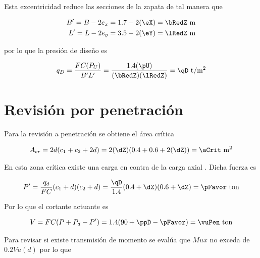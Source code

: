 \documentclass[11pt,a4paper,fleqn]{article}
\begin{document}
Esta excentricidad reduce las secciones de la zapata de tal manera que


\begin{align*}
	B'=B-2e_x=\bZ-2(\eX)=\bRedZ \text{ m}\\
	L'=L-2e_y=\lZ-2(\eY)=\lRedZ \text{ m}
\end{align*}

por lo que la presión de diseño es

\begin{align*}
	q_D=\frac{FC(P_U)}{B'L'}=\frac{\fcCarga(\pU)}{(\bRedZ)(\lRedZ)}=\qD \text{ t/m$^2$}
\end{align*}

\section{Revisión por penetración}
Para la revisión a penetración se obtiene el área crítica


\begin{align*}
	A_{cr}=2d(c_1+c_2+2d)=2(\dZ)(\caZ+\cbZ+2(\dZ))=\aCrit \text{ m$^2$}
\end{align*}

En esta zona crítica existe una carga en contra de la carga axial . Dicha fuerza es

\begin{align*}
	P'=\frac{q_d}{FC}(c_1+d)(c_2+d)=\frac{\qD}{\fcCarga}(\caZ+\dZ)(\cbZ+\dZ)=\pFavor \text{ ton}
\end{align*}

Por lo que el cortante actuante es

\begin{align*}
	V=FC(P+P_d-P')=\fcCarga(\pZ+\ppD-\pFavor)=\vuPen \text{ ton}
\end{align*}



Para revisar si existe transmisión de momento se evalúa que $Mux$ no exceda de $0.2Vu(d)$ por lo que
\end{document}
